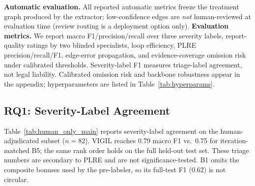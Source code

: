 \textbf{Automatic evaluation.} All reported automatic metrics freeze the treatment graph produced by the extractor; low-confidence edges are \emph{not} human-reviewed at evaluation time (review routing is a deployment option only). \textbf{Evaluation metrics.} We report macro F1/precision/recall over three severity labels, report-quality ratings by two blinded specialists, loop efficiency, PLRE precision/recall/F1, edge-error propagation, and evidence-coverage omission risk under calibrated thresholds. Severity-label F1 measures triage-label agreement, not legal liability. Calibrated omission risk and backbone robustness appear in the appendix; hyperparameters are listed in Table~\ref{tab:hyperparams}.

\subsection{RQ1: Severity-Label Agreement}

Table~\ref{tab:human_only_main} reports severity-label agreement on the human-adjudicated subset ($n{=}82$). VIGIL reaches 0.79 macro F1 vs.\ 0.75 for iteration-matched B5; the same rank order holds on the full held-out test set. These triage numbers are secondary to PLRE and are not significance-tested. B1 omits the composite bonuses used by the pre-labeler, so its full-test F1 (0.62) is not circular.

\begin{table}[t]
\centering
\caption{Macro severity-label agreement. Human-adjudicated subset ($n{=}82$; primary). Full: held-out test including retained pre-labels.}
\label{tab:human_only_main}
\small
\setlength{\tabcolsep}{3pt}
\end{table}

